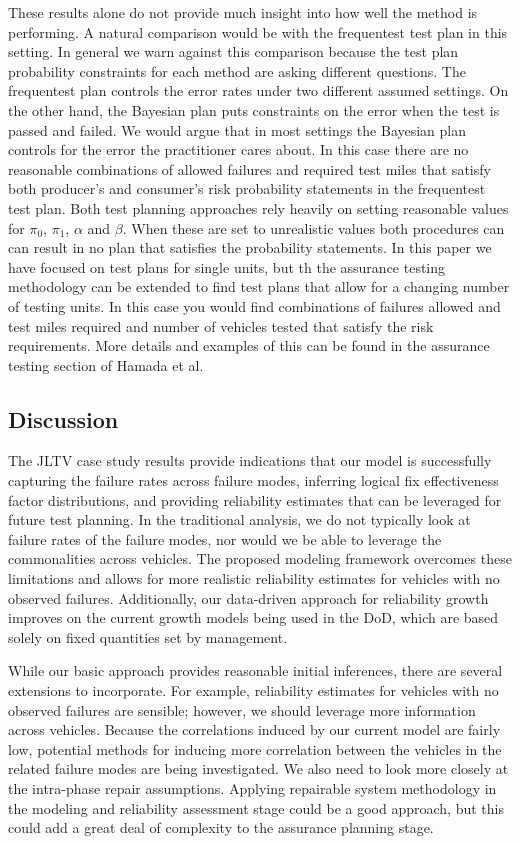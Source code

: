 \documentclass[12pt]{article}
\begin{document}
These results alone do not provide much insight into how well the method is
performing. A natural comparison would be with the frequentest test plan in this
setting.  In general  we warn against this comparison because the test plan
probability constraints for each  method are asking different questions.  The
frequentest plan controls the error rates  under two different assumed settings.
On the other hand, the Bayesian plan puts constraints  on the error when the test
is passed and failed.  We would argue that in most settings  the Bayesian plan
controls for the error the practitioner cares about.  In this case there are no
reasonable combinations of allowed failures and required test miles  that
satisfy both producer's and consumer's risk probability statements in the
frequentest test plan.
Both test planning approaches rely heavily on setting reasonable values for
$\pi_0$, $\pi_1$, $\alpha$ and $\beta$.   When these are set to unrealistic
values both procedures can can result in no plan that satisfies the probability
statements.  In this paper we have focused on test plans for single units, but
th the assurance testing methodology can be extended to find test plans that
allow for a changing number of testing units.  In this case you would find
combinations of failures allowed and test miles required and number of vehicles
tested that satisfy the risk requirements. More details and examples of this can
be found in the assurance testing section of Hamada et al. ~\cite{ref6}

\subsection{Discussion}
The JLTV case study results provide indications that our model is successfully
capturing the failure rates across failure modes, inferring logical fix
effectiveness factor distributions, and providing reliability estimates that can
be leveraged for future test planning. In the traditional analysis, we do not
typically look at failure rates of the failure modes, nor would we be able to
leverage the commonalities across vehicles. The proposed modeling framework
overcomes these limitations and allows for more realistic reliability estimates
for vehicles with no observed failures. Additionally, our data-driven approach
for reliability growth improves on the current growth models being used in the
DoD, which are based solely on fixed quantities set by management.

While our basic approach provides reasonable initial inferences, there are
several extensions to incorporate. For example, reliability estimates for
vehicles with no observed failures are sensible; however, we should leverage
more information across vehicles. Because the correlations induced by our
current model are fairly low, potential methods for inducing more correlation
between the vehicles in the related failure modes are being investigated. We
also need to look more closely at the intra-phase repair assumptions.  Applying
repairable system methodology in the modeling and reliability assessment stage
could be a good approach, but this could  add a great deal of complexity to the
assurance planning stage.
\end{document}
